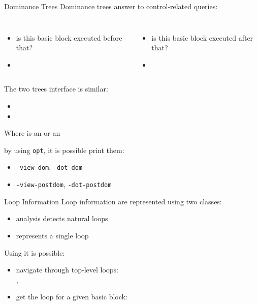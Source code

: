 \documentclass[10pt,mathserif]{beamer}
\begin{document}
\begin{frame}{Dominance Trees}
Dominance trees answer to control-related queries:

\begin{columns}[t]
\begin{itemize}
\item is this basic block executed before that?
\item {}
\end{itemize}

\begin{itemize}
\item is this basic block executed after that?
\item {}
\end{itemize}
\end{columns}

\vfill
The two trees interface is similar:

\begin{itemize}
\item {}
\item {}
\end{itemize}

Where  is an  or an

\vfill
by using \texttt{opt}, it is possible print them:

\begin{itemize}
\item \texttt{-view-dom}, \texttt{-dot-dom}
\item \texttt{-view-postdom}, \texttt{-dot-postdom}
\end{itemize}
\end{frame}

\begin{frame}{Loop Information}
Loop information are represented using two classes:

\begin{itemize}
\item {} analysis detects natural loops
\item {} represents a single loop
\end{itemize}

\vfill
Using  it is possible:

\begin{itemize}
\item navigate through top-level loops: \\
      , 
\item get the loop for a given basic block: \\
\end{itemize}
\end{frame}
\end{document}
